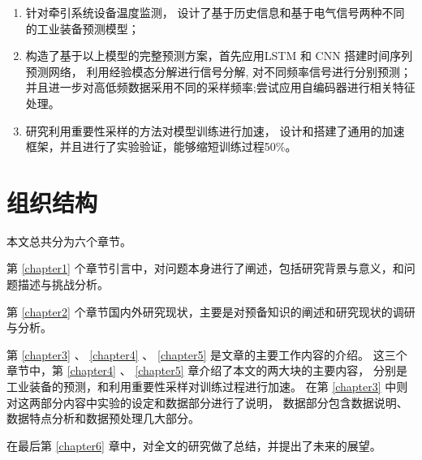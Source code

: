 \begin{enumerate}
  \item 针对牵引系统设备温度监测，
  设计了基于历史信息和基于电气信号两种不同的工业装备预测模型； 
  \item 构造了基于以上模型的完整预测方案，首先应用LSTM 和 CNN 搭建时间序列预测网络，
  利用经验模态分解进行信号分解,
  对不同频率信号进行分别预测；
  并且进一步对高低频数据采用不同的采样频率;尝试应用自编码器进行相关特征处理。 
  \item 研究利用重要性采样的方法对模型训练进行加速， 设计和搭建了通用的加速框架，并且进行了实验验证，能够缩短训练过程50\%。
\end{enumerate}

\section{组织结构}
本文总共分为六个章节。

第 \ref{chapter1} 个章节引言中，对问题本身进行了阐述，包括研究背景与意义，和问题描述与挑战分析。

第 \ref{chapter2} 个章节国内外研究现状，主要是对预备知识的阐述和研究现状的调研与分析。

第 \ref{chapter3} 、 \ref{chapter4} 、 \ref{chapter5} 是文章的主要工作内容的介绍。
这三个章节中，第 \ref{chapter4} 、 \ref{chapter5} 章介绍了本文的两大块的主要内容，
分别是工业装备的预测，和利用重要性采样对训练过程进行加速。
在第 \ref{chapter3} 中则对这两部分内容中实验的设定和数据部分进行了说明，
数据部分包含数据说明、数据特点分析和数据预处理几大部分。

在最后第  \ref{chapter6} 章中，对全文的研究做了总结，并提出了未来的展望。
